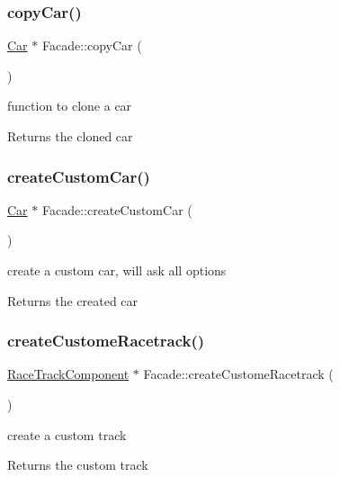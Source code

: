 \subsubsection{\texorpdfstring{copy\+Car()}{copyCar()}}
{\footnotesize\ttfamily \mbox{\hyperlink{class_car}{Car}} $\ast$ Facade\+::copy\+Car (\begin{DoxyParamCaption}{ }\end{DoxyParamCaption})}

function to clone a car \begin{DoxyReturn}{Returns}
the cloned car 
\end{DoxyReturn}
\mbox{\label{class_facade_abdb018bece78a8749c0e9c59fc66b06d}} 
\subsubsection{\texorpdfstring{create\+Custom\+Car()}{createCustomCar()}}
{\footnotesize\ttfamily \mbox{\hyperlink{class_car}{Car}} $\ast$ Facade\+::create\+Custom\+Car (\begin{DoxyParamCaption}{ }\end{DoxyParamCaption})}

create a custom car, will ask all options \begin{DoxyReturn}{Returns}
the created car 
\end{DoxyReturn}
\mbox{\label{class_facade_a63d9892bcb04cf1406be32f548585c47}} 
\subsubsection{\texorpdfstring{create\+Custome\+Racetrack()}{createCustomeRacetrack()}}
{\footnotesize\ttfamily \mbox{\hyperlink{class_race_track_component}{Race\+Track\+Component}} $\ast$ Facade\+::create\+Custome\+Racetrack (\begin{DoxyParamCaption}{ }\end{DoxyParamCaption})}

create a custom track \begin{DoxyReturn}{Returns}
the custom track 
\end{DoxyReturn}
\mbox{\label{class_facade_a390cd556494bcb05b4d61e276f14c603}} 
